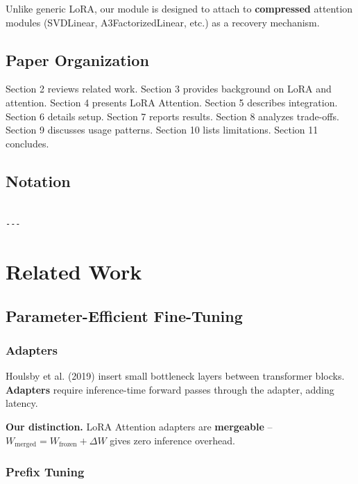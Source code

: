 Unlike generic LoRA, our module is designed to attach to \textbf{compressed} 
attention modules (SVDLinear, A3FactorizedLinear, etc.) as a recovery 
mechanism.

\subsection{Paper Organization}

Section 2 reviews related work. Section 3 provides background on LoRA and 
attention. Section 4 presents LoRA Attention. Section 5 describes 
integration. Section 6 details setup. Section 7 reports results. Section 8 
analyzes trade-offs. Section 9 discusses usage patterns. Section 10 lists 
limitations. Section 11 concludes.



\subsection{Notation}

\begin{lstlisting}

---
\end{lstlisting}

\section{Related Work}

\subsection{Parameter-Efficient Fine-Tuning}

\subsubsection{Adapters}

Houlsby et al. (2019) insert small bottleneck layers between transformer 
blocks. \textbf{Adapters} require inference-time forward passes through the 
adapter, adding latency.

\textbf{Our distinction.} LoRA Attention adapters are \textbf{mergeable} -- 
$W_\text{merged} = W_\text{frozen} + \Delta W$ gives zero inference 
overhead.

\subsubsection{Prefix Tuning}

